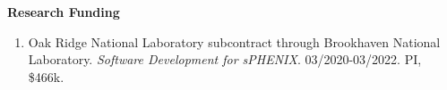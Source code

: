 \documentclass[11pt]{article}
\begin{document}
\vspace{7pt}

\begin{flushleft}
	\LARGE\textbf{Research Funding}
	\vspace{4pt}
	\normalsize
	\begin{center}
		\begin{enumerate}
			\item Oak Ridge National Laboratory subcontract through Brookhaven National Laboratory. \textit{Software Development for sPHENIX}. 03/2020-03/2022. PI, \$466k.
		\end{enumerate}
	\end{center}
\end{flushleft}


\vspace{7pt}
\end{document}
